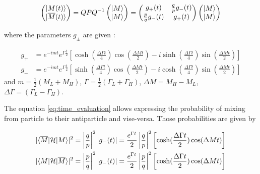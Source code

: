 \begin{align}
\label{eq:time_evaluation}
  \left(\begin{matrix} \lvert M(t)\rangle  \\ \lvert\overline{M}(t)\rangle \end{matrix}  \right) 
  = QPQ^{-1} \left(\begin{matrix} \lvert M\rangle  \\ \lvert M\rangle \end{matrix}  \right) 
  = \left(\begin{matrix} g_{+}(t) &  \frac{q}{p}g_{-}(t)  \\  \frac{p}{q}g_{-}(t)  & g_{+}(t)  \end{matrix}\right) 
  \left(\begin{matrix} \lvert M\rangle  \\ \lvert M\rangle \end{matrix}  \right)   
\end{align}

where the parameters $g_{\pm}$ are given :

\begin{align}
    g_{+} &= e^{-imt}e^{\Gamma \frac{t}{2}} \left[ \cosh(\frac{\Delta \Gamma t}{4})\cos(\frac{\Delta M t}{2})  - i\sinh(\frac{\Delta \Gamma t}{4})\sin(\frac{\Delta M t}{2})  \right] \\ 
    g_{-} &= e^{-imt}e^{\Gamma \frac{t}{2}} \left[ \sinh(\frac{\Delta \Gamma t}{4})\cos(\frac{\Delta M t}{2})  - i\cosh(\frac{\Delta \Gamma t}{4})\sin(\frac{\Delta M t}{2})  \right]   
\end{align}
and $m = \frac{1}{2}(M_{L}+M_H)$, $\Gamma =  \frac{1}{2}(\Gamma_{L}+\Gamma_{H})$, $\Delta M = M_{H}- M_{L}$, $ \Delta \Gamma =(\Gamma_{L}-\Gamma_{H})$.

The equation \ref{eq:time_evaluation} allows expressing the probability of mixing from particle to their antiparticle and vise-versa. Those probabilities are given by 

\begin{align}
\label{eq:mixing_prob}
|\langle\overline{M}\rvert \mathcal{H} \lvert M\rangle|^{2} = \left|\frac{q}{p}\right|^{2} |g_{-}(t)| = \frac{e^{\Gamma t}}{2} \left|\frac{q}{p}\right|^{2}  \left[ \cosh(\frac{\Delta \Gamma t}{2})\cos(\Delta M t) \right] \\ 
|\langle M\rvert \mathcal{H} \lvert\overline{M}\rangle|^{2} = \left|\frac{p}{q}\right|^{2} |g_{-}(t)| = \frac{e^{\Gamma t}}{2} \left|\frac{p}{q}\right|^{2}  \left[ \cosh(\frac{\Delta \Gamma t}{2})\cos(\Delta M t) \right]
\end{align}

